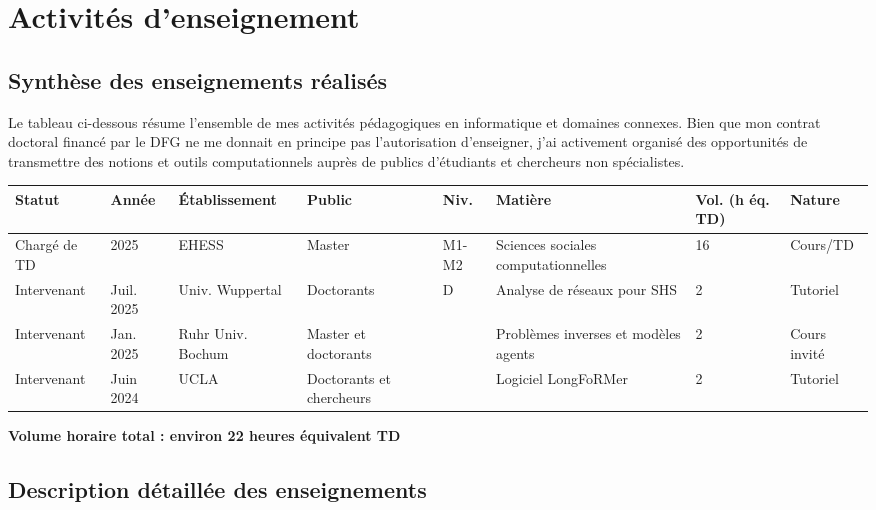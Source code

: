 \documentclass[11pt,a4paper]{article}
\begin{document}

\section{Activités d'enseignement}

\subsection{Synthèse des enseignements réalisés}

Le tableau ci-dessous résume l'ensemble de mes activités pédagogiques en informatique et domaines connexes. Bien que mon contrat doctoral financé par le DFG ne me donnait en principe pas l'autorisation d'enseigner, j'ai activement organisé des opportunités de transmettre des notions et outils computationnels auprès de publics d'étudiants et chercheurs non spécialistes.

\vspace{0.3cm}

\small
\noindent\begin{tabularx}{\textwidth}{|p{1.6cm}|p{1cm}|p{2.2cm}|p{1.5cm}|p{0.8cm}|p{2.8cm}|p{1cm}|X|}
\hline
\textbf{Statut} & \textbf{Année} & \textbf{Établissement} & \textbf{Public} & \textbf{Niv.} & \textbf{Matière} & \textbf{Vol. (h éq. TD)} & \textbf{Nature} \\
\hline
Chargé de TD & 2025 & EHESS & Master & M1-M2 & Sciences sociales computationnelles & 16 & Cours/TD \\
\hline
Intervenant & Juil. 2025 & Univ. Wuppertal & Doctorants & D & Analyse de réseaux pour SHS & 2 & Tutoriel \\
\hline
Intervenant & Jan. 2025 & Ruhr Univ. Bochum & Master et doctorants & ~ & Problèmes inverses et modèles agents & 2 & Cours invité \\
\hline
Intervenant & Juin 2024 & UCLA & Doctorants et chercheurs & ~ & Logiciel LongFoRMer & 2 & Tutoriel \\
\hline
\end{tabularx}
\normalsize

\vspace{0.3cm}

\textbf{Volume horaire total : environ 22 heures équivalent TD}

\subsection{Description détaillée des enseignements}
\end{document}
